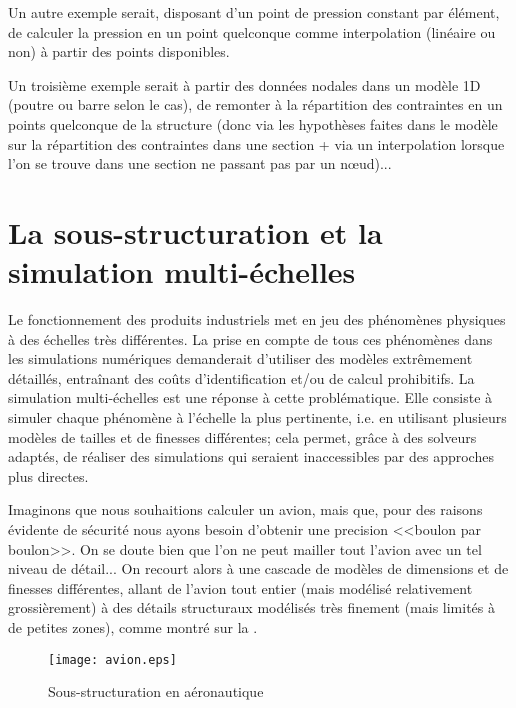 \medskip
Un autre exemple serait, disposant d'un point de pression constant par élément, de
calculer la pression en un point quelconque comme interpolation (linéaire ou non) à 
partir des points disponibles.

\medskip
Un troisième exemple serait à partir des données nodales dans un modèle 1D
(poutre ou barre selon le cas), de remonter à la répartition des contraintes en un
points quelconque de la structure (donc via les hypothèses faites dans le modèle
sur la répartition des contraintes dans une section + via un interpolation lorsque l'on se 
trouve dans une section ne passant pas par un nœud)...

\ifVersionAvecExemplesSepares\else
\fi






\medskip
\section{La sous-structuration et la simulation multi-échelles}\label{Sec-ssstruc}

Le fonctionnement des produits industriels met en jeu des phénomènes physiques à des
échelles très différentes. 
La prise en compte de tous ces phénomènes dans les simulations numériques demanderait 
d'utiliser des modèles extrêmement détaillés, entraînant des coûts d'identification 
et/ou de calcul prohibitifs. 
La simulation multi-échelles est une réponse à cette problématique. 
Elle consiste à simuler chaque phénomène à l'échelle la plus pertinente, 
i.e. en utilisant plusieurs modèles de tailles et de finesses différentes; cela permet, 
grâce à des solveurs adaptés, de réaliser des simulations qui seraient inaccessibles 
par des approches plus directes.

\medskip
Imaginons que nous souhaitions calculer un avion, mais que, pour des raisons
évidente de sécurité nous ayons besoin d'obtenir une precision <<boulon par boulon>>.
On se doute bien que l'on ne peut mailler tout l'avion avec un tel niveau de détail...
On recourt alors à une cascade de modèles de dimensions et de finesses différentes, 
allant de l'avion tout entier (mais modélisé relativement grossièrement) à
des détails structuraux modélisés très finement (mais limités à de petites zones), comme
montré sur la .
\begin{figure}[htb]
\centerline{\texttt{[image: avion.eps]}}
\caption{Sous-structuration en aéronautique}\label{Fig-avion}
\end{figure}

